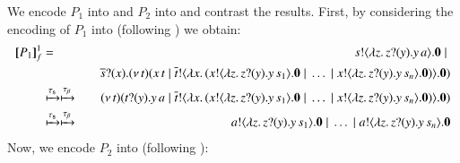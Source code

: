 \documentclass[preprint,11pt]{elsarticle}
\begin{document}
{{%
We encode $P_1$ into \HO and $P_2$ into \sessp and contrast the results. 
First, by considering the encoding of $P_1$ into \HO  (following )
we obtain:
\begin{eqnarray*}
[\!\![P_1]\!\!]^{1}_f & = &  	s ! \langle \lambda z.\,z ? (y) . y\, {a} \rangle . \mathbf{0} \;|\; \\
& & \quad  \overline{s} ? (x) . (\nu\, t)(x\, {t} \;|\; \overline{t} ! \langle \lambda x.\,(x ! \langle \lambda z.\,z ? (y) . y\, {s_1} \rangle . \mathbf{0} \;|\; \dots \;|\; x ! \langle \lambda z.\,z ? (y) . y\, {s_n} \rangle . \mathbf{0}) \rangle . \mathbf{0})\\
	& \xmapsto{\tau_{\mathsf{s}}} \xmapsto{\tau_{\beta}} & 
	(\nu\, t)(t ? (y) . y\, {a} \;|\; \overline{t} ! \langle \lambda x.\,(x ! \langle \lambda z.\,z ? (y) . y\, {s_1} \rangle . \mathbf{0} \;|\; \dots \;|\; x ! \langle \lambda z.\,z ? (y) . y\, {s_n} \rangle . \mathbf{0}) \rangle . \mathbf{0})\\
	& \xmapsto{\tau_{\mathsf{s}}}\xmapsto{\tau_{\beta}}  & 
	a ! \langle \lambda z.\,z ? (y) . y\, {s_1} \rangle . \mathbf{0} \;|\; \dots \;|\; a ! \langle \lambda z.\,z ? (y) . y\, {s_n} \rangle . \mathbf{0}
\end{eqnarray*}
Now, we encode $P_2$ into \sessp (following ):
}}
\end{document}
